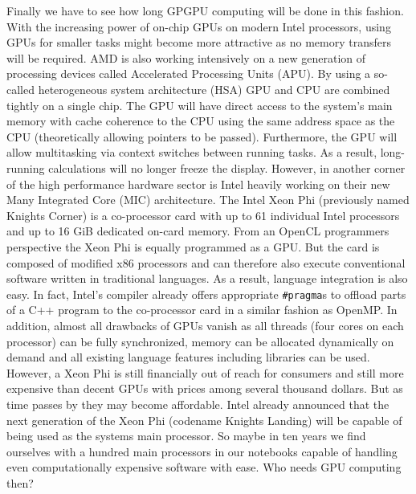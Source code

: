 Finally we have to see how long GPGPU computing will be done in this fashion. With the increasing power of on-chip GPUs on modern Intel processors, using GPUs for smaller tasks might become more attractive as no memory transfers will be required. AMD is also working intensively on a new generation of processing devices called Accelerated Processing Units (APU). By using a so-called heterogeneous system architecture (HSA) GPU and CPU are combined tightly on a single chip. The GPU will have direct access to the system's main memory with cache coherence to the CPU using the same address space as the CPU (theoretically allowing pointers to be passed). Furthermore, the GPU will allow multitasking via context switches between running tasks. As a result, long-running calculations will no longer freeze the display.
However, in another corner of the high performance hardware sector is Intel heavily working on their new Many Integrated Core (MIC) architecture. The Intel Xeon Phi (previously named Knights Corner) is a co-processor card with up to 61 individual Intel processors and up to 16 GiB dedicated on-card memory. From an OpenCL programmers perspective the Xeon Phi is equally programmed as a GPU. But the card is composed of modified x86 processors and can therefore also execute conventional software written in traditional languages. As a result, language integration is also easy. In fact, Intel's compiler already offers appropriate \lstinline!#pragma!s to offload parts of a C++ program to the co-processor card in a similar fashion as OpenMP. In addition, almost all drawbacks of GPUs vanish as all threads (four cores on each processor) can be fully synchronized, memory can be allocated dynamically on demand and all existing language features including libraries can be used. However, a Xeon Phi is still financially out of reach for consumers and still more expensive than decent GPUs with prices among several thousand dollars. But as time passes by they may become affordable. Intel already announced that the next generation of the Xeon Phi (codename Knights Landing) will be capable of being used as the systems main processor. So maybe in ten years we find ourselves with a hundred main processors in our notebooks capable of handling even computationally expensive software with ease. Who needs GPU computing then?
